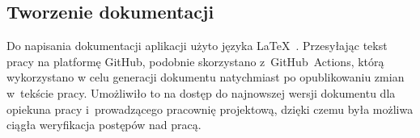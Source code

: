 \subsection{Tworzenie dokumentacji}

Do napisania dokumentacji aplikacji użyto języka \LaTeX~\cite{Latex}.
Przesyłając tekst pracy na platformę GitHub, podobnie skorzystano
\mbox{z GitHub Actions}, którą wykorzystano w celu
generacji dokumentu natychmiast po opublikowaniu zmian w~tekście pracy.
Umożliwiło to na dostęp do najnowszej wersji dokumentu dla opiekuna
pracy i~prowadzącego pracownię projektową, dzięki czemu była możliwa
ciągła weryfikacja postępów nad pracą.

